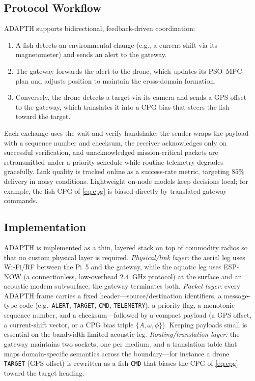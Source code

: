 \documentclass[journal]{IEEEtran}
\begin{document}
\subsection{Protocol Workflow}
ADAPTH supports bidirectional, feedback-driven coordination:
\begin{enumerate}
  \item A fish detects an environmental change (e.g., a current shift via its
  magnetometer) and sends an alert to the gateway.
  \item The gateway forwards the alert to the drone, which updates its PSO--MPC
  plan and adjusts position to maintain the cross-domain formation.
  \item Conversely, the drone detects a target via its camera and sends a GPS
  offset to the gateway, which translates it into a CPG bias that steers the fish
  toward the target.
\end{enumerate}
Each exchange uses the wait-and-verify handshake: the sender wraps the payload
with a sequence number and checksum, the receiver acknowledges only on successful
verification, and unacknowledged mission-critical packets are retransmitted under
a priority schedule while routine telemetry degrades gracefully. Link quality is
tracked online as a success-rate metric, targeting $85\%$ delivery in noisy
conditions. Lightweight on-node models keep decisions local; for example, the fish
CPG of \eqref{eq:cpg} is biased directly by translated gateway commands.

\subsection{Implementation}
ADAPTH is implemented as a thin, layered stack on top of commodity radios so that
no custom physical layer is required. \emph{Physical/link layer:} the aerial leg
uses Wi-Fi/RF between the Pi~5 and the gateway, while the aquatic leg uses ESP-NOW
(a connectionless, low-overhead $2.4$~GHz protocol) at the surface and an acoustic
modem sub-surface; the gateway terminates both. \emph{Packet layer:} every ADAPTH
frame carries a fixed header---source/destination identifiers, a message-type code
(e.g.\ \texttt{ALERT}, \texttt{TARGET}, \texttt{CMD}, \texttt{TELEMETRY}), a
priority flag, a monotonic sequence number, and a checksum---followed by a compact
payload (a GPS offset, a current-shift vector, or a CPG bias triple
$\{A,\omega,\phi\}$). Keeping payloads small is essential on the bandwidth-limited
acoustic leg. \emph{Routing/translation layer:} the gateway maintains two sockets,
one per medium, and a translation table that maps domain-specific semantics across
the boundary---for instance a drone \texttt{TARGET} (GPS offset) is rewritten as a
fish \texttt{CMD} that biases the CPG of \eqref{eq:cpg} toward the target heading.
\end{document}
